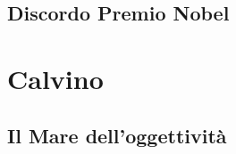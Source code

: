 \documentclass{article}
\begin{document}
\subsection{Discordo Premio Nobel} %
\label{sub:Discordo Premio Nobel}


\section{Calvino} %
\label{sec:Calvino}
\subsection{Il Mare dell'oggettività} %
\label{sub:Il Mare dell'oggettività}


\printbibliography
\end{document}
